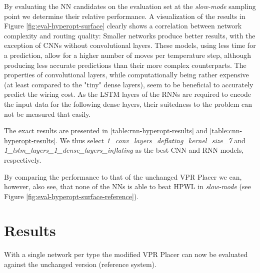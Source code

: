 By evaluating the \gls{NN} candidates on the evaluation set at the \textit{slow-mode} sampling point we determine their relative performance. A visualization of the results in Figure \ref{fig:eval-hyperopt-surface} clearly shows a correlation between network complexity and routing quality: Smaller networks produce better results, with the exception of \glspl{CNN} without convolutional layers. These models, using less time for a prediction, allow for a higher number of moves per temperature step, although producing less accurate predictions than their more complex counterparts. The properties of convolutional layers, while computationally being rather expensive (at least compared to the "tiny" dense layers), seem to be beneficial to accurately predict the wiring cost. As the \gls{LSTM} layers of the \glspl{RNN} are required to encode the input data for the following dense layers, their suitedness to the problem can not be measured that easily.

The exact results are presented in \ref{table:rnn-hyperopt-results} and \ref{table:cnn-hyperopt-results}. We thus select \textit{1\_conv\_layers\_deflating\_kernel\_size\_7} and \textit{1\_lstm\_layers\_1\_dense\_layers\_inflating} as the best \gls{CNN} and \gls{RNN} models, respectively.

By comparing the performance to that of the unchanged \gls{VPR} Placer we can, however, also see, that none of the \glspl{NN} is able to beat \gls{HPWL} in \textit{slow-mode} (see Figure \ref{fig:eval-hyperopt-surface-reference}).

\section{Results}

With a single network per type the modified \gls{VPR} Placer can now be evaluated against the unchanged version (reference system).

